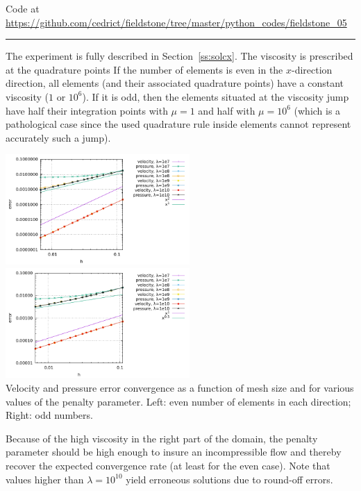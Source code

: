 

\begin{center}
Code at \url{https://github.com/cedrict/fieldstone/tree/master/python_codes/fieldstone_05}
\end{center}

\par\noindent\rule{\textwidth}{0.4pt}

The experiment is fully described in Section~\ref{ss:solcx}.
The viscosity is prescribed at the quadrature points 
If the number of elements is even in the $x$-direction direction, all elements 
(and their associated quadrature points)
have a constant viscosity ($1$ or  $10^6$). If it is odd, then the elements situated 
at the viscosity jump have half their integration points with $\mu=1$ and half with $\mu=10^6$ 
(which is a pathological case since the used quadrature rule inside elements cannot represent 
accurately such a jump).  

\begin{center}
\includegraphics[width=7cm]{python_codes/fieldstone_05/results/errors_even.pdf}
\includegraphics[width=7cm]{python_codes/fieldstone_05/results/errors_odd.pdf}\\
{\captionfont Velocity and pressure error convergence as a function of mesh size and for various values
of the penalty parameter. Left: even number of elements in each direction; Right: odd numbers.
}
\end{center}

Because of the high viscosity in the right part of the domain, the penalty parameter should 
be high enough to insure an incompressible flow and thereby recover the expected convergence rate
(at least for the even case). Note that values higher than $\lambda=10^{10}$ yield erroneous solutions 
due to round-off errors. 

